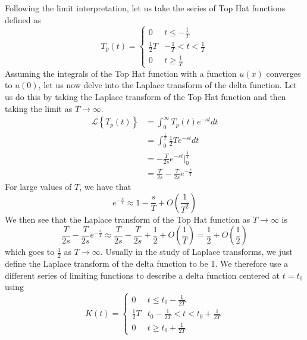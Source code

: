 \documentclass{report}
\theoremstyle{definition}
\theoremstyle{remark}
\newcommand{\lapt}[1]{\mathscr{L}\left\{ #1\right\}}
\begin{document}
Following the limit interpretation, let us take the series of Top Hat functions defined as 
\begin{equation*}
    T_p(t) = \begin{cases}
        0 &t\leq -\frac{1}{T} \\
        \tfrac{1}{2}T &-\frac{1}{T} < t < \frac{1}{T} \\
        0 &t \geq\frac{1}{T}
    \end{cases}
\end{equation*}
Assuming the integrals of the Top Hat function with a function $u(x)$ converges to $u(0)$, let us now delve into the Laplace transform of the delta function. Let us do this by taking the Laplace transform of the Top Hat function and then taking the limit as $T\rightarrow \infty$.
\begin{equation*}
    \begin{split}
        \lapt{T_p(t)} &= \int^\infty _0 T_p(t)e^{-st}dt \\
        &= \int^{\tfrac{1}{T}}_0\frac{1}{2}Te^{-st}dt \\
        &= -\frac{T}{2s}e^{-st} \Bigg|_0^{\tfrac{1}{T}} \\
        &= \frac{T}{2s} - \frac{T}{2s}e^{-\tfrac{s}{T}}
    \end{split}
\end{equation*}
For large values of $T$, we have that 
\begin{equation*}
    e^{-\tfrac{s}{T}} \approx 1-\frac{s}{T} + O\left( \frac{1}{T^2}\right)
\end{equation*}
We then see that the Laplace transform of the Top Hat function as $T\rightarrow \infty$ is 
\begin{equation*}
    \frac{T}{2s} - \frac{T}{2s}e^{-\tfrac{s}{T}} \approx \frac{T}{2s} - \frac{T}{2s} +\frac{1}{2} + O\left( \frac{1}{T} \right) = \frac{1}{2} + O\left( \frac{1}{2} \right)
\end{equation*}
which goes to $\tfrac{1}{2}$ as $T\rightarrow \infty$. Usually in the study of Laplace transforms, we just define the Laplace transform of the delta function to be 1. We therefore use a different series of limiting functions to describe a delta function centered at $t=t_0$ using 
\begin{equation*}
    K(t) = \begin{cases}
        0 &t\leq t_0 -\frac{1}{2T}\\
        \frac{1}{2}T &t_0 -\frac{1}{2T}< t<t_0 +\frac{1}{2T} \\
        0 &t\geq t_0 +\frac{1}{2T}
    \end{cases}
\end{equation*}
\end{document}
